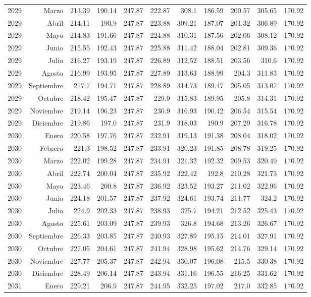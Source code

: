 \documentclass{article}%
\begin{document}
\begin{longtable}{|l r|r|r|r|r|r|r|r|r|r|}
2029&Marzo&213.39&190.14&247.87&222.87&308.1&186.59&200.57&305.65&170.92\\%
2029&Abril&214.11&190.9&247.87&223.88&309.21&187.07&201.32&306.89&170.92\\%
2029&Mayo&214.83&191.66&247.87&224.88&310.31&187.56&202.06&308.12&170.92\\%
2029&Junio&215.55&192.43&247.87&225.88&311.42&188.04&202.81&309.36&170.92\\%
2029&Julio&216.27&193.19&247.87&226.89&312.52&188.51&203.56&310.6&170.92\\%
2029&Agosto&216.99&193.95&247.87&227.89&313.63&188.99&204.3&311.83&170.92\\%
2029&Septiembre&217.7&194.71&247.87&228.89&314.73&189.47&205.05&313.07&170.92\\%
2029&Octubre&218.42&195.47&247.87&229.9&315.83&189.95&205.8&314.31&170.92\\%
2029&Noviembre&219.14&196.23&247.87&230.9&316.93&190.42&206.54&315.54&170.92\\%
2029&Diciembre&219.86&197.0&247.87&231.9&318.03&190.9&207.29&316.78&170.92\\%
2030&Enero&220.58&197.76&247.87&232.91&319.13&191.38&208.04&318.02&170.92\\%
2030&Febrero&221.3&198.52&247.87&233.91&320.23&191.85&208.78&319.25&170.92\\%
2030&Marzo&222.02&199.28&247.87&234.91&321.32&192.32&209.53&320.49&170.92\\%
2030&Abril&222.74&200.04&247.87&235.92&322.42&192.8&210.28&321.73&170.92\\%
2030&Mayo&223.46&200.8&247.87&236.92&323.52&193.27&211.02&322.96&170.92\\%
2030&Junio&224.18&201.57&247.87&237.92&324.61&193.74&211.77&324.2&170.92\\%
2030&Julio&224.9&202.33&247.87&238.93&325.7&194.21&212.52&325.43&170.92\\%
2030&Agosto&225.61&203.09&247.87&239.93&326.8&194.68&213.26&326.67&170.92\\%
2030&Septiembre&226.33&203.85&247.87&240.93&327.89&195.15&214.01&327.91&170.92\\%
2030&Octubre&227.05&204.61&247.87&241.94&328.98&195.62&214.76&329.14&170.92\\%
2030&Noviembre&227.77&205.37&247.87&242.94&330.07&196.08&215.5&330.38&170.92\\%
2030&Diciembre&228.49&206.14&247.87&243.94&331.16&196.55&216.25&331.62&170.92\\%
2031&Enero&229.21&206.9&247.87&244.95&332.25&197.02&217.0&332.85&170.92\\%

\end{longtable}
\end{document}
